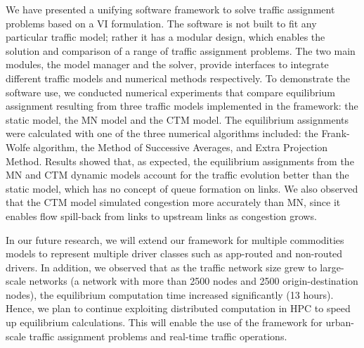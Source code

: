 We have presented a unifying software framework to solve traffic assignment problems based on a VI formulation. The software is not built to fit any particular traffic model; rather it has a modular design, which enables the solution and comparison of a range of traffic assignment problems. The two main modules, the model manager and the solver, provide interfaces to integrate different traffic models and numerical methods respectively. To demonstrate the software use, we conducted numerical experiments that compare equilibrium assignment resulting from three traffic models implemented in the framework: the static model, the MN model and the CTM model. The equilibrium assignments were calculated with one of the three numerical algorithms included: the Frank-Wolfe algorithm, the Method of Successive Averages, and Extra Projection Method. Results showed that, as expected, the equilibrium assignments from the MN and CTM dynamic models account for the traffic evolution better than the static model, which has no concept of queue formation on links. We also observed that the CTM model simulated congestion more accurately than MN, since it enables flow spill-back from links to upstream links as congestion grows.

In our future research, we will extend our framework for multiple commodities models to represent multiple driver classes such as app-routed and non-routed drivers. In addition, we observed that as the traffic network size grew to large-scale networks (a network with more than 2500 nodes and 2500 origin-destination nodes), the equilibrium computation time increased significantly (13 hours). Hence, we plan to continue exploiting distributed computation in HPC to speed up equilibrium calculations. This will enable the use of the framework for urban-scale traffic assignment problems and real-time traffic operations. 

